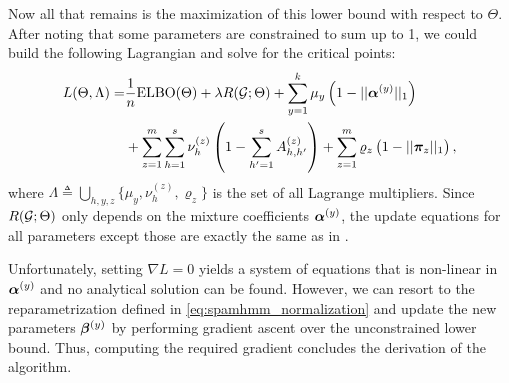 Now all that remains is the maximization of this lower bound with respect to $\Theta$. After noting that some parameters are constrained to sum up to 1, we could build the following Lagrangian and solve for the critical points:
\begin{align}
	L(\Theta, \Lambda) = & \frac{1}{n} \mathrm{ELBO}(\Theta) + \lambda R({\mathcal{G}}; \Theta) + \sum_{y=1}^k \mu_y\left(1 - ||{\bm{\alpha}}^{(y)}||_{1}\right) \nonumber\\
	&+ \sum_{z=1}^m \sum_{h=1}^s \nu^{(z)}_h \left(1 - \sum_{h'=1}^s {A}^{(z)}_{h,h'}\right)
	+ \sum_{z=1}^m \varrho_z \left(1 - ||{\bm{\pi}}_z||_{1}\right),
\end{align}
where $\Lambda \triangleq \bigcup_{h,y,z} \{\mu_y, \nu^{(z)}_h, \varrho_z\}$ is the set of all Lagrange multipliers. Since $R({\mathcal{G}}; \Theta)$ only depends on the mixture coefficients ${\bm{\alpha}}^{(y)}$, the update equations for all parameters except those are exactly the same as in .

Unfortunately, setting $\nabla L = 0$ yields a system of equations that is non-linear in ${\bm{\alpha}}^{(y)}$ and no analytical solution can be found. However, we can resort to the reparametrization defined in \eqref{eq:spamhmm_normalization} and update the new parameters ${\bm{\beta}}^{(y)}$ by performing gradient ascent over the unconstrained lower bound. Thus, computing the required gradient concludes the derivation of the algorithm.

